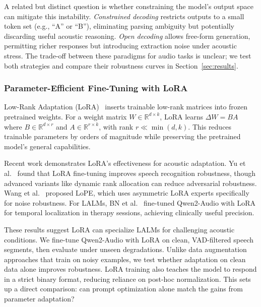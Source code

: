 \documentclass[11pt,a4paper]{article}
\begin{document}
A related but distinct question is whether constraining the model's output space can
mitigate this instability. \textit{Constrained decoding} restricts outputs to a small token set
(e.g., ``A'' or ``B''), eliminating parsing ambiguity but potentially discarding useful
acoustic reasoning. \textit{Open decoding} allows free-form generation, permitting richer responses
but introducing extraction noise under acoustic stress. The trade-off between these paradigms
for audio tasks is unclear; we test both strategies and compare their robustness curves
in Section~\ref{sec:results}.

\subsubsection{Parameter-Efficient Fine-Tuning with LoRA}
\label{subsubsec:lora}

Low-Rank Adaptation (LoRA)~\cite{hu2022lora} inserts trainable low-rank matrices into frozen pretrained weights. For a weight matrix $W \in \mathbb{R}^{d \times k}$, LoRA learns $\Delta W = BA$ where $B \in \mathbb{R}^{d \times r}$ and $A \in \mathbb{R}^{r \times k}$, with rank $r \ll \min(d,k)$. This reduces trainable parameters by orders of magnitude while preserving the pretrained model's general capabilities.

Recent work demonstrates LoRA's effectiveness for acoustic adaptation. Yu et al.~\cite{yu2024investigating} found that LoRA fine-tuning improves speech recognition robustness, though advanced variants like dynamic rank allocation can reduce adversarial robustness. Wang et al.~\cite{wang2025lope} proposed LoPE, which uses asymmetric LoRA experts specifically for noise robustness. For LALMs, BN et al.~\cite{bn2025finetuning} fine-tuned Qwen2-Audio with LoRA for temporal localization in therapy sessions, achieving clinically useful precision.

These results suggest LoRA can specialize LALMs for challenging acoustic conditions. We fine-tune Qwen2-Audio with LoRA on clean, VAD-filtered speech segments, then evaluate under unseen degradations. Unlike data augmentation approaches that train on noisy examples, we test whether adaptation on clean data alone improves robustness. LoRA training also teaches the model to respond in a strict binary format, reducing reliance on post-hoc normalization. This sets up a direct comparison: can prompt optimization alone match the gains from parameter adaptation?

\end{document}
